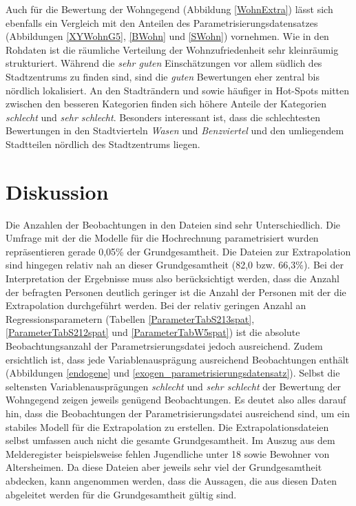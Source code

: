 \documentclass{Vorlage}
\begin{document}
Auch für die Bewertung der Wohngegend (Abbildung \ref{WohnExtra}) lässt sich ebenfalls ein Vergleich mit den Anteilen des Parametrisierungsdatensatzes (Abbildungen \ref{XYWohnG5}, \ref{BWohn} und \ref{SWohn}) vornehmen. Wie in den Rohdaten ist die räumliche Verteilung der Wohnzufriedenheit sehr kleinräumig strukturiert. Während die \textit{sehr guten} Einschätzungen vor allem südlich des Stadtzentrums zu finden sind, sind die \textit{guten} Bewertungen eher zentral bis nördlich lokalisiert. An den Stadträndern und sowie häufiger in Hot-Spots mitten zwischen den besseren Kategorien finden sich höhere Anteile der Kategorien \textit{schlecht} und \textit{sehr schlecht}. Besonders interessant ist, dass die schlechtesten Bewertungen in den Stadtvierteln \textit{Wasen} und \textit{Benzviertel} und den umliegendem Stadtteilen nördlich des Stadtzentrums liegen.

\clearpage
\section{Diskussion}
Die Anzahlen der Beobachtungen in den Dateien sind sehr Unterschiedlich. Die Umfrage mit der die Modelle für die Hochrechnung parametrisiert wurden repräsentieren gerade 0,05\% der Grundgesamtheit. Die Dateien zur Extrapolation sind hingegen relativ nah an dieser Grundgesamtheit (82,0 bzw. 66,3\%). Bei der Interpretation der Ergebnisse muss also berücksichtigt werden, dass die Anzahl der befragten Personen deutlich geringer ist die Anzahl der Personen mit der die Extrapolation durchgeführt werden. Bei der relativ geringen Anzahl an Regressionsparametern (Tabellen \ref{ParameterTabS213spat}, \ref{ParameterTabS212spat} und \ref{ParameterTabW5spat}) ist die absolute Beobachtungsanzahl der Parametrsierungsdatei jedoch ausreichend. Zudem ersichtlich ist, dass jede Variablenausprägung ausreichend Beobachtungen enthält (Abbildungen \ref{endogene} und \ref{exogen_parametrisierungsdatensatz}). Selbst die seltensten Variablenausprägungen \textit{schlecht} und \textit{sehr schlecht} der Bewertung der Wohngegend zeigen jeweils genügend Beobachtungen. Es deutet also alles darauf hin, dass die Beobachtungen der Parametrisierungsdatei ausreichend sind, um ein stabiles Modell für die Extrapolation zu erstellen. Die Extrapolationsdateien selbst umfassen auch nicht die gesamte Grundgesamtheit. Im Auszug aus dem Melderegister beispielsweise fehlen Jugendliche unter 18 sowie Bewohner von Altersheimen. Da diese Dateien aber jeweils sehr viel der Grundgesamtheit abdecken, kann angenommen werden, dass die Aussagen, die aus diesen Daten abgeleitet werden für die Grundgesamtheit gültig sind.
\end{document}
